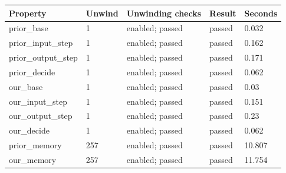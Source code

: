 \begin{tabular}{lllll}
\hline
Property & Unwind & Unwinding checks & Result & Seconds \\
\hline
prior\_base & 1 & enabled; passed & passed & 0.032 \\
prior\_input\_step & 1 & enabled; passed & passed & 0.162 \\
prior\_output\_step & 1 & enabled; passed & passed & 0.171 \\
prior\_decide & 1 & enabled; passed & passed & 0.062 \\
our\_base & 1 & enabled; passed & passed & 0.03 \\
our\_input\_step & 1 & enabled; passed & passed & 0.151 \\
our\_output\_step & 1 & enabled; passed & passed & 0.23 \\
our\_decide & 1 & enabled; passed & passed & 0.062 \\
prior\_memory & 257 & enabled; passed & passed & 10.807 \\
our\_memory & 257 & enabled; passed & passed & 11.754 \\
\hline
\end{tabular}

